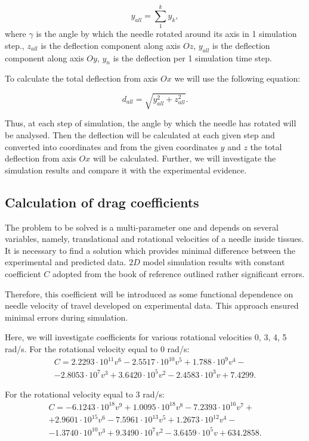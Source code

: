 \documentclass[a4paper]{jpconf}
\begin{document}
\begin{equation} \label{eq10}
y_{all} = \sum\limits_{1}^{k} y_{k},
\end{equation}
where  $\gamma$  is the angle by which the needle rotated around its axis in 1 simulation step., $z_{all} $  is the deflection component along axis $Oz$, $y_{all}$  is the deflection component along axis $Oy$, $y_{n}$  is the deflection per 1 simulation time step.

To calculate the total deflection from axis $Ox$ we will use the following equation:

\begin{equation} \label{eq11}
d_{all} = \sqrt{y_{all}^2  +  z_{all} ^2}.
\end{equation}

Thus, at each step of simulation, the angle by which the needle has rotated will be analysed. Then the deflection will be calculated at each given step and converted into coordinates and from the given coordinates $y$ and $z$ the total deflection from axis $Ox$ will be calculated. Further, we will investigate the simulation results and compare it with the experimental evidence.

\subsection{Calculation of drag coefficients}
The problem to be solved is a multi-parameter one and depends on several variables, namely, translational and rotational velocities of a needle inside tissues. It is necessary to find a solution which provides minimal difference between the experimental and predicted data. $2D$ model simulation results with constant coefficient $C$ adopted from the book of reference outlined rather significant errors.

Therefore, this coefficient will be introduced as some functional dependence on needle velocity of travel developed on experimental data. This approach ensured minimal errors during simulation. 

Here, we will investigate coefficients for various rotational velocities 0, 3, 4, 5 rad/s.
For the rotational velocity equal to 0 rad/s:
\begin{multline} \label{eq12}
C= 2.2293\cdot10^{11} v^6 - 2.5517\cdot10^{10} v^5+1.788\cdot10^9 v^4 - \\ -2.8053\cdot10^7 v^3 +3.6420\cdot10^5 v^2-2.4583\cdot10^3 v+7.4299.
\end{multline}

For the rotational velocity equal to 3 rad/s:
\begin{multline} \label{eq13}
C= -6.1243\cdot10^{18} v^9 + 1.0095\cdot10^{18}v^8 -  7.2393\cdot10^{16} v^7 +\\+ 2.9601\cdot10^{15} v^6 - 7.5961\cdot10^{13} v^5 + 1.2673\cdot10^{12} v^4 - \\-1.3740\cdot10^{10} v^3 + 9.3490\cdot10^7 v^2 - 3.6459\cdot10^5 v+ 634.2858.
\end{multline}
\end{document}
